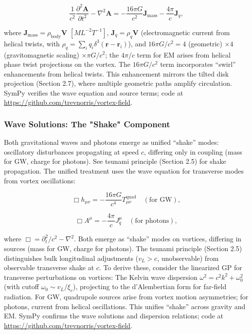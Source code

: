 \begin{equation}
\frac{1}{c^2} \frac{\partial^2 \mathbf{A}}{\partial t^2} - \nabla^2 \mathbf{A} = -\frac{16\pi G}{c^2} \mathbf{J}_{\text{mass}} - \frac{4\pi}{c} \mathbf{J}_q,
\end{equation}

where $\mathbf{J}_{\text{mass}} = \rho_{\text{body}} \mathbf{V}$ $[M L^{-2} T^{-1}]$, $\mathbf{J}_q = \rho_q \mathbf{V}$ (electromagnetic current from helical twists, with $\rho_q = \sum_i q_i \delta^3(\mathbf{r} - \mathbf{r}_i)$), and $16\pi G/c^2 = 4$ (geometric) $\times 4$ (gravitomagnetic scaling) $\times \pi G/c^2$; the $4\pi/c$ term for EM arises from helical phase twist projections on the vortex. The $16\pi G/c^2$ term incorporates ``swirl'' enhancements from helical twists. This enhancement mirrors the tilted disk projection (Section 2.7), where multiple geometric paths amplify circulation. SymPy verifies the wave equation and source terms; code at \url{https://github.com/trevnorris/vortex-field}.

\subsubsection{Wave Solutions: The "Shake" Component}

Both gravitational waves and photons emerge as unified ``shake'' modes: oscillatory disturbances propagating at speed $c$, differing only in coupling (mass for GW, charge for photons). See tsunami principle (Section 2.5) for shake propagation. The unified treatment uses the wave equation for transverse modes from vortex oscillations:

\begin{equation}
\Box h_{\mu\nu} = -\frac{16\pi G}{c^4} T_{\mu\nu}^{\text{quad}} \quad (\text{for GW}),
\end{equation}

\begin{equation}
\Box A^\mu = -\frac{4\pi}{c} J_q^\mu \quad (\text{for photons}),
\end{equation}

where $\Box = \partial_t^2 / c^2 - \nabla^2$. Both emerge as ``shake'' modes on vortices, differing in sources (mass for GW, charge for photons). The tsunami principle (Section 2.5) distinguishes bulk longitudinal adjustments ($v_L > c$, unobservable) from observable transverse shake at $c$. To derive these, consider the linearized GP for transverse perturbations on vortices: The Kelvin wave dispersion $\omega^2 = c^2 k^2 + \omega_0^2$ (with cutoff $\omega_0 \sim v_L / \xi_c$), projecting to the d'Alembertian form for far-field radiation. For GW, quadrupole sources arise from vortex motion asymmetries; for photons, current from helical oscillations. This unifies ``shake'' across gravity and EM. SymPy confirms the wave solutions and dispersion relations; code at \url{https://github.com/trevnorris/vortex-field}.

